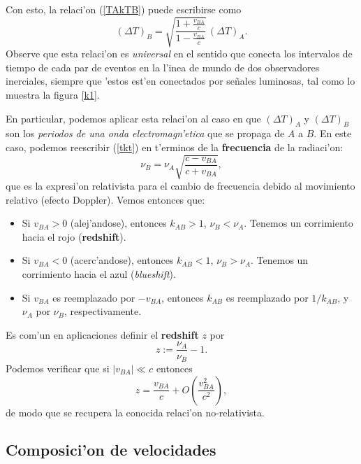 Con esto, la relaci'on (\ref{TAkTB}) puede escribirse como
\begin{equation}
(\Delta T)_B=\sqrt{\frac{1+\frac{v_{BA}}{c}}{1-\frac{v_{BA}}{c}}}
\,(\Delta T)_A. \label{k2}
\end{equation}
Observe que esta relaci'on es \textit{universal} en el sentido que conecta los intervalos de tiempo de cada par de eventos en la l'inea de mundo de dos observadores inerciales, siempre que 'estos est'en conectados por se\~nales luminosas, tal como lo muestra la figura \ref{k1}.

En particular, podemos aplicar esta relaci'on al caso en que $(\Delta T)_A$ y
$(\Delta T)_B$ son los \textit{periodos de una onda electromagn'etica} que se propaga de $A$ a $B$. En este caso, podemos reescribir (\ref{tkt}) en t'erminos de la \textbf{frecuencia} de la radiaci'on:
\begin{equation}
\nu_B=\nu_A\sqrt{\frac{c-v_{BA}}{c+v_{BA}}},
\end{equation}
que es la expresi'on relativista para el cambio de frecuencia debido al movimiento relativo (efecto Doppler). Vemos entonces que:
\begin{itemize}
\item Si $v_{BA}>0$ (alej'andose), entonces $k_{AB}>1$, $\nu_B <
\nu_A$.
Tenemos un corrimiento hacia el rojo (\textbf{redshift}).
\item Si $v_{BA}<0$ (acerc'andose), entonces $k_{AB}<1$, $\nu_B >
\nu_A$.
Tenemos un corrimiento hacia el azul (\textit{blueshift}).
\item Si $v_{BA}$ es reemplazado por $-v_{BA}$, entonces $k_{AB}$ es reemplazado
por $1/{k_{AB}}$, y $\nu_A$ por $\nu_B$, respectivamente.
\end{itemize}
Es com'un en aplicaciones definir el \textbf{redshift} $z$ por
\begin{equation}
z:=\frac{\nu_A}{\nu_B}-1.
\end{equation}
Podemos verificar que si $|v_{BA}|\ll c$ entonces 
\begin{equation}
z=\frac{v_{BA}}{c}+O(\frac{v_{BA}^2}{c^2}),
\end{equation}
de modo que se recupera la conocida relaci'on no-relativista.

\subsection{Composici'on de velocidades}

